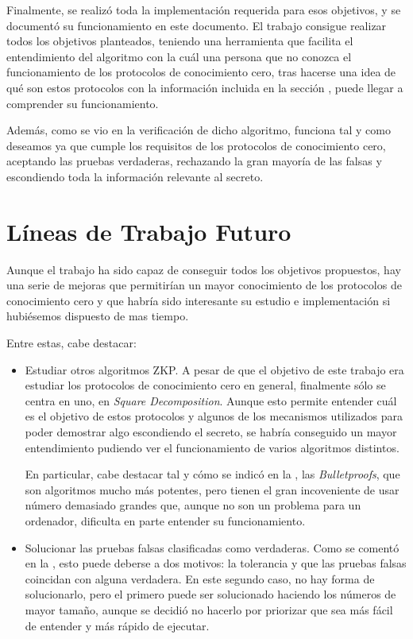 Finalmente, se realizó toda la implementación requerida para esos objetivos, y se documentó su funcionamiento en este documento. El trabajo consigue realizar todos los objetivos planteados, teniendo una herramienta que facilita el entendimiento del algoritmo con la cuál una persona que no conozca el funcionamiento de los protocolos de conocimiento cero, tras hacerse una idea de qué son estos protocolos con la información incluida en la sección , puede llegar a comprender su funcionamiento.

Además, como se vio en la verificación de dicho algoritmo, funciona tal y como deseamos ya que cumple los requisitos de los protocolos de conocimiento cero, aceptando las pruebas verdaderas, rechazando la gran mayoría de las falsas y escondiendo toda la información relevante al secreto.

\section{Líneas de Trabajo Futuro}

Aunque el trabajo ha sido capaz de conseguir todos los objetivos propuestos, hay una serie de mejoras que permitirían un mayor conocimiento de los protocolos de conocimiento cero y que habría sido interesante su estudio e implementación si hubiésemos dispuesto de mas tiempo.

Entre estas, cabe destacar:
\begin{itemize}
    \item Estudiar otros algoritmos ZKP. A pesar de que el objetivo de este trabajo era estudiar los protocolos de conocimiento cero en general, finalmente sólo se centra en uno, en \emph{Square Decomposition}. Aunque esto permite entender cuál es el objetivo de estos protocolos y algunos de los mecanismos utilizados para poder demostrar algo escondiendo el secreto, se habría conseguido un mayor entendimiento pudiendo ver el funcionamiento de varios algoritmos distintos.

    En particular, cabe destacar tal y cómo se indicó en la , las \emph{Bulletproofs}, que son algoritmos mucho más potentes, pero tienen el gran incoveniente de usar número demasiado grandes que, aunque no son un problema para un ordenador, dificulta en parte entender su funcionamiento.

    \item Solucionar las pruebas falsas clasificadas como verdaderas. Como se comentó en la , esto puede deberse a dos motivos: la tolerancia y que las pruebas falsas coincidan con alguna verdadera. En este segundo caso, no hay forma de solucionarlo, pero el primero puede ser solucionado haciendo los números de mayor tamaño, aunque se decidió no hacerlo por priorizar que sea más fácil de entender y más rápido de ejecutar.
\end{itemize}